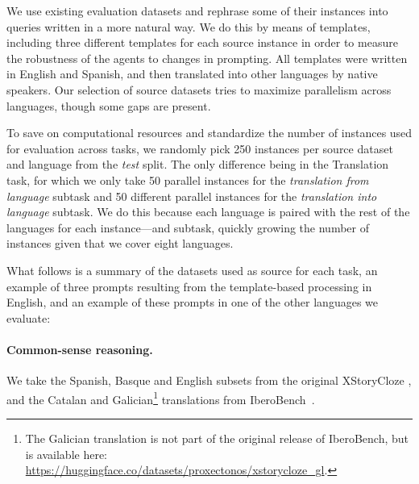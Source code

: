 We use existing evaluation datasets and rephrase some of their instances into queries written in a more natural way. We do this by means of templates, including three different templates for each source instance in order to measure the robustness of the agents to changes in prompting. All templates were written in English and Spanish, and then translated into other languages by native speakers. Our selection of source datasets tries to maximize parallelism across languages, though some gaps are present.

To save on computational resources and standardize the number of instances used for evaluation across tasks, we randomly pick 250 instances per source dataset and language from the \emph{test} split. The only difference being in the Translation task, for which we only take 50 parallel instances for the \emph{translation from language} subtask and 50 different parallel instances for the \emph{translation into language} subtask. We do this because each language is paired with the rest of the languages for each instance—and subtask, quickly growing the number of instances given that we cover eight languages.

What follows is a summary of the datasets used as source for each task, an example of three prompts resulting from the template-based processing in English, and an example of these prompts in one of the other languages we evaluate:

\paragraph{Common-sense reasoning.} We take the Spanish, Basque and English subsets from the original XStoryCloze \citep{lin-etal-2022-shot}, and the Catalan and Galician\footnote{The Galician translation is not part of the original release of IberoBench, but is available here: \url{https://huggingface.co/datasets/proxectonos/xstorycloze_gl}.} translations from \hbox{IberoBench \citep{iberobench-coling-2025}}. 



